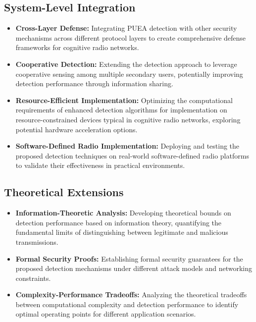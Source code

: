 \subsection{System-Level Integration}

\begin{itemize}
    \item \textbf{Cross-Layer Defense:} Integrating PUEA detection with other security mechanisms across different protocol layers to create comprehensive defense frameworks for cognitive radio networks.

    \item \textbf{Cooperative Detection:} Extending the detection approach to leverage cooperative sensing among multiple secondary users, potentially improving detection performance through information sharing.
    
    \item \textbf{Resource-Efficient Implementation:} Optimizing the computational requirements of enhanced detection algorithms for implementation on resource-constrained devices typical in cognitive radio networks, exploring potential hardware acceleration options.
    
    \item \textbf{Software-Defined Radio Implementation:} Deploying and testing the proposed detection techniques on real-world software-defined radio platforms to validate their effectiveness in practical environments.
\end{itemize}

\subsection{Theoretical Extensions}

\begin{itemize}
    \item \textbf{Information-Theoretic Analysis:} Developing theoretical bounds on detection performance based on information theory, quantifying the fundamental limits of distinguishing between legitimate and malicious transmissions.
    
    \item \textbf{Formal Security Proofs:} Establishing formal security guarantees for the proposed detection mechanisms under different attack models and networking constraints.
    
    \item \textbf{Complexity-Performance Tradeoffs:} Analyzing the theoretical tradeoffs between computational complexity and detection performance to identify optimal operating points for different application scenarios.
\end{itemize}

